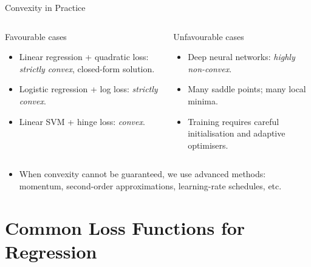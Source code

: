 \begin{frame}{Convexity in Practice}
  \begin{columns}[T]
    \begin{block}{Favourable cases}
      \begin{itemize}
        \item Linear regression + quadratic loss: \emph{strictly convex}, closed-form solution.
        \item Logistic regression + log loss: \emph{strictly convex}.
        \item Linear SVM + hinge loss: \emph{convex}.
      \end{itemize}
    \end{block}

    \begin{block}{Unfavourable cases}
      \begin{itemize}
        \item Deep neural networks: \emph{highly non-convex}.
        \item Many saddle points; many local minima.
        \item Training requires careful initialisation and adaptive optimisers.
      \end{itemize}
    \end{block}
  \end{columns}

  \vspace{.5em}
  \begin{itemize}
    \item When convexity cannot be guaranteed, we use advanced methods:
      momentum, second-order approximations, learning-rate schedules, etc.
  \end{itemize}
\end{frame}

\section{Common Loss Functions for Regression}

